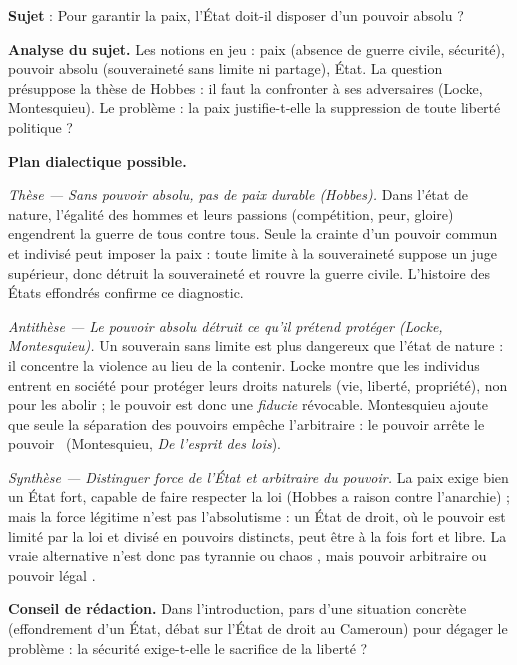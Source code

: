\documentclass[11pt]{article}
\newcommand{\cle}[1]{{\popxbold\color{popdark}#1}}
\begin{document}
\begin{exoresolu}
\textbf{Sujet} : Pour garantir la paix, l'État doit-il disposer d'un pouvoir absolu ?

\tcblower

\textbf{Analyse du sujet.} Les notions en jeu : \cle{paix} (absence de guerre civile, sécurité), \cle{pouvoir absolu} (souveraineté sans limite ni partage), \cle{État}. La question présuppose la thèse de Hobbes : il faut la confronter à ses adversaires (Locke, Montesquieu). Le problème : la paix justifie-t-elle la suppression de toute liberté politique ?

\textbf{Plan dialectique possible.}

\emph{Thèse — Sans pouvoir absolu, pas de paix durable (Hobbes).} Dans l'état de nature, l'égalité des hommes et leurs passions (compétition, peur, gloire) engendrent la guerre de tous contre tous. Seule la crainte d'un pouvoir commun et indivisé peut imposer la paix : toute limite à la souveraineté suppose un juge supérieur, donc détruit la souveraineté et rouvre la guerre civile. L'histoire des États effondrés confirme ce diagnostic.

\emph{Antithèse — Le pouvoir absolu détruit ce qu'il prétend protéger (Locke, Montesquieu).} Un souverain sans limite est plus dangereux que l'état de nature : il concentre la violence au lieu de la contenir. Locke montre que les individus entrent en société pour protéger leurs droits naturels (vie, liberté, propriété), non pour les abolir ; le pouvoir est donc une \emph{fiducie} révocable. Montesquieu ajoute que seule la séparation des pouvoirs empêche l'arbitraire : \guillemotleft le pouvoir arrête le pouvoir \guillemotright\ (Montesquieu, \emph{De l'esprit des lois}).

\emph{Synthèse — Distinguer force de l'État et arbitraire du pouvoir.} La paix exige bien un État fort, capable de faire respecter la loi (Hobbes a raison contre l'anarchie) ; mais la force légitime n'est pas l'absolutisme : un État de droit, où le pouvoir est limité par la loi et divisé en pouvoirs distincts, peut être à la fois fort et libre. La vraie alternative n'est donc pas \guillemotleft tyrannie ou chaos \guillemotright, mais \guillemotleft pouvoir arbitraire ou pouvoir légal \guillemotright.

\textbf{Conseil de rédaction.} Dans l'introduction, pars d'une situation concrète (effondrement d'un État, débat sur l'État de droit au Cameroun) pour dégager le problème : la sécurité exige-t-elle le sacrifice de la liberté ?
\end{exoresolu}
\end{document}
